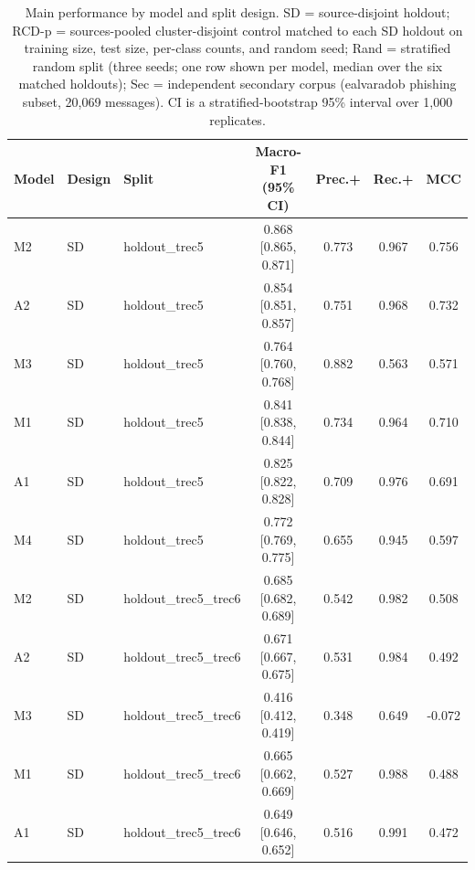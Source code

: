 
\begin{table}[!htbp]
\centering
\caption{Main performance by model and split design. SD = source-disjoint holdout; RCD-p = sources-pooled cluster-disjoint control matched to each SD holdout on training size, test size, per-class counts, and random seed; Rand = stratified random split (three seeds; one row shown per model, median over the six matched holdouts); Sec = independent secondary corpus (ealvaradob phishing subset, 20{,}069 messages). CI is a stratified-bootstrap 95\% interval over 1{,}000 replicates.}
\label{tab:performance}
\begin{tabular}{lllcccc}
\hline\hline
Model & Design & Split & Macro-F1 (95\% CI) & Prec.+ & Rec.+ & MCC \\
\hline
M2 & SD & holdout\_trec5 & 0.868 [0.865, 0.871] & 0.773 & 0.967 & 0.756 \\
A2 & SD & holdout\_trec5 & 0.854 [0.851, 0.857] & 0.751 & 0.968 & 0.732 \\
M3 & SD & holdout\_trec5 & 0.764 [0.760, 0.768] & 0.882 & 0.563 & 0.571 \\
M1 & SD & holdout\_trec5 & 0.841 [0.838, 0.844] & 0.734 & 0.964 & 0.710 \\
A1 & SD & holdout\_trec5 & 0.825 [0.822, 0.828] & 0.709 & 0.976 & 0.691 \\
M4 & SD & holdout\_trec5 & 0.772 [0.769, 0.775] & 0.655 & 0.945 & 0.597 \\
M2 & SD & holdout\_trec5\_trec6 & 0.685 [0.682, 0.689] & 0.542 & 0.982 & 0.508 \\
A2 & SD & holdout\_trec5\_trec6 & 0.671 [0.667, 0.675] & 0.531 & 0.984 & 0.492 \\
M3 & SD & holdout\_trec5\_trec6 & 0.416 [0.412, 0.419] & 0.348 & 0.649 & -0.072 \\
M1 & SD & holdout\_trec5\_trec6 & 0.665 [0.662, 0.669] & 0.527 & 0.988 & 0.488 \\
A1 & SD & holdout\_trec5\_trec6 & 0.649 [0.646, 0.652] & 0.516 & 0.991 & 0.472 \\

\end{tabular}
\end{table}
